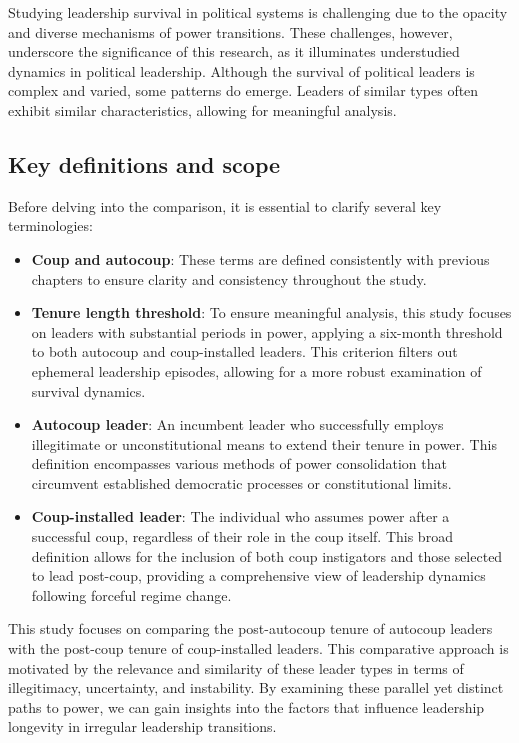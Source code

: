\documentclass[
  12pt,
]{report}
\begin{document}
Studying leadership survival in political systems is challenging due to
the opacity and diverse mechanisms of power transitions. These
challenges, however, underscore the significance of this research, as it
illuminates understudied dynamics in political leadership. Although the
survival of political leaders is complex and varied, some patterns do
emerge. Leaders of similar types often exhibit similar characteristics,
allowing for meaningful analysis.

\subsection{Key definitions and scope}\label{key-definitions-and-scope}

Before delving into the comparison, it is essential to clarify several
key terminologies:

\begin{itemize}
\item
  \textbf{Coup and autocoup}: These terms are defined consistently with
  previous chapters to ensure clarity and consistency throughout the
  study.
\item
  \textbf{Tenure length threshold}: To ensure meaningful analysis, this
  study focuses on leaders with substantial periods in power, applying a
  six-month threshold to both autocoup and coup-installed leaders. This
  criterion filters out ephemeral leadership episodes, allowing for a
  more robust examination of survival dynamics.
\item
  \textbf{Autocoup leader}: An incumbent leader who successfully employs
  illegitimate or unconstitutional means to extend their tenure in
  power. This definition encompasses various methods of power
  consolidation that circumvent established democratic processes or
  constitutional limits.
\item
  \textbf{Coup-installed leader}: The individual who assumes power after
  a successful coup, regardless of their role in the coup itself. This
  broad definition allows for the inclusion of both coup instigators and
  those selected to lead post-coup, providing a comprehensive view of
  leadership dynamics following forceful regime change.
\end{itemize}

This study focuses on comparing the post-autocoup tenure of autocoup
leaders with the post-coup tenure of coup-installed leaders. This
comparative approach is motivated by the relevance and similarity of
these leader types in terms of illegitimacy, uncertainty, and
instability. By examining these parallel yet distinct paths to power, we
can gain insights into the factors that influence leadership longevity
in irregular leadership transitions.
\end{document}
